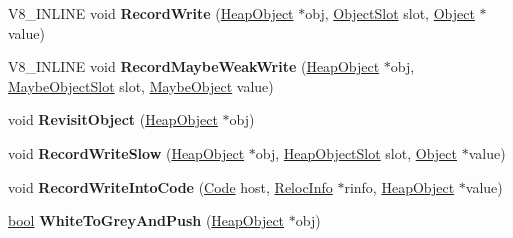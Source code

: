 \begin{DoxyCompactItemize}
\item 
\mbox{\label{classv8_1_1internal_1_1IncrementalMarking_a4bcf204ed91456bd9990fe89f1481576}} 
V8\+\_\+\+I\+N\+L\+I\+NE void {\bfseries Record\+Write} (\mbox{\hyperlink{classv8_1_1internal_1_1HeapObject}{Heap\+Object}} $\ast$obj, \mbox{\hyperlink{classv8_1_1internal_1_1ObjectSlot}{Object\+Slot}} slot, \mbox{\hyperlink{classv8_1_1internal_1_1Object}{Object}} $\ast$value)
\item 
\mbox{\label{classv8_1_1internal_1_1IncrementalMarking_affe364d02c58b4229a6f996afcfdc058}} 
V8\+\_\+\+I\+N\+L\+I\+NE void {\bfseries Record\+Maybe\+Weak\+Write} (\mbox{\hyperlink{classv8_1_1internal_1_1HeapObject}{Heap\+Object}} $\ast$obj, \mbox{\hyperlink{classv8_1_1internal_1_1MaybeObjectSlot}{Maybe\+Object\+Slot}} slot, \mbox{\hyperlink{classv8_1_1internal_1_1MaybeObject}{Maybe\+Object}} value)
\item 
\mbox{\label{classv8_1_1internal_1_1IncrementalMarking_a4e4518eaba995968210d0c8ea8211306}} 
void {\bfseries Revisit\+Object} (\mbox{\hyperlink{classv8_1_1internal_1_1HeapObject}{Heap\+Object}} $\ast$obj)
\item 
\mbox{\label{classv8_1_1internal_1_1IncrementalMarking_aa85f18033f604ee726a9bcf6e2c0b305}} 
void {\bfseries Record\+Write\+Slow} (\mbox{\hyperlink{classv8_1_1internal_1_1HeapObject}{Heap\+Object}} $\ast$obj, \mbox{\hyperlink{classv8_1_1internal_1_1HeapObjectSlot}{Heap\+Object\+Slot}} slot, \mbox{\hyperlink{classv8_1_1internal_1_1Object}{Object}} $\ast$value)
\item 
\mbox{\label{classv8_1_1internal_1_1IncrementalMarking_ad3712ba24ea01b45cd3d8e187022b4b5}} 
void {\bfseries Record\+Write\+Into\+Code} (\mbox{\hyperlink{classv8_1_1internal_1_1Code}{Code}} host, \mbox{\hyperlink{classv8_1_1internal_1_1RelocInfo}{Reloc\+Info}} $\ast$rinfo, \mbox{\hyperlink{classv8_1_1internal_1_1HeapObject}{Heap\+Object}} $\ast$value)
\item 
\mbox{\label{classv8_1_1internal_1_1IncrementalMarking_a52ac75f7723aebce9fd0b8c459eb02b0}} 
\mbox{\hyperlink{classbool}{bool}} {\bfseries White\+To\+Grey\+And\+Push} (\mbox{\hyperlink{classv8_1_1internal_1_1HeapObject}{Heap\+Object}} $\ast$obj)

\end{DoxyCompactItemize}
